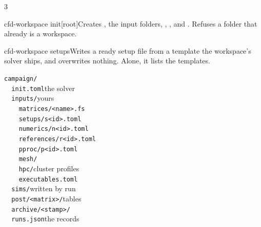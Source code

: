 \begin{multicols}{3}
\begin{cmdblock}{cfd-workspace init}{[root]}{Creates , the input folders, , ,  and . Refuses a folder that already is a workspace.}
\end{cmdblock}

\begin{cmdblock}{cfd-workspace setups}{}{Writes a ready setup file  from a template the workspace's solver ships, and overwrites nothing. Alone, it lists the templates.}
\end{cmdblock}

\texttt{campaign/}\\
\texttt{\ \ init.toml}\quad the solver\\
\texttt{\ \ inputs/}\quad yours\\
\texttt{\ \ \ \ matrices/<name>.fs}\\
\texttt{\ \ \ \ setups/s<id>.toml}\\
\texttt{\ \ \ \ numerics/n<id>.toml}\\
\texttt{\ \ \ \ references/r<id>.toml}\\
\texttt{\ \ \ \ pproc/p<id>.toml}\\
\texttt{\ \ \ \ mesh/}\\
\texttt{\ \ \ \ hpc/}\quad cluster profiles\\
\texttt{\ \ \ \ executables.toml}\\
\texttt{\ \ sims/}\quad written by run\\
\texttt{\ \ post/<matrix>/}\quad tables\\
\texttt{\ \ archive/<stamp>/}\\
\texttt{\ \ runs.json}\quad the records



\end{multicols}
